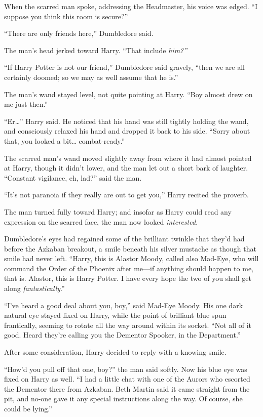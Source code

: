 When the scarred man spoke, addressing the Headmaster, his voice was
edged. ``I suppose you think this room is secure?''

``There are only friends here,'' Dumbledore said.

The man's head jerked toward Harry. ``That include \emph{him?''}

``If Harry Potter is not our friend,'' Dumbledore said gravely, ``then
we are all certainly doomed; so we may as well assume that he is.''

The man's wand stayed level, not quite pointing at Harry. ``Boy almost
drew on me just then.''

``Er\ldots{}'' Harry said. He noticed that his hand was still tightly
holding the wand, and consciously relaxed his hand and dropped it back
to his side. ``Sorry about that, you looked a bit\ldots{}
combat-ready.''

The scarred man's wand moved slightly away from where it had almost
pointed at Harry, though it didn't lower, and the man let out a short
bark of laughter. ``Constant vigilance, eh, lad?'' said the man.

``It's not paranoia if they really are out to get you,'' Harry recited
the proverb.

The man turned fully toward Harry; and insofar as Harry could read any
expression on the scarred face, the man now looked \emph{interested}.

Dumbledore's eyes had regained some of the brilliant twinkle that they'd
had before the Azkaban breakout, a smile beneath his silver mustache as
though that smile had never left. ``Harry, this is Alastor Moody, called
also Mad-Eye, who will command the Order of the Phoenix after me---if
anything should happen to me, that is. Alastor, this is Harry Potter. I
have every hope the two of you shall get along \emph{fantastically}.''

``I've heard a good deal about you, boy,'' said Mad-Eye Moody. His one
dark natural eye stayed fixed on Harry, while the point of brilliant
blue spun frantically, seeming to rotate all the way around within its
socket. ``Not all of it good. Heard they're calling you the Dementor
Spooker, in the Department.''

After some consideration, Harry decided to reply with a knowing smile.

``How'd you pull off that one, boy?'' the man said softly. Now his blue
eye was fixed on Harry as well. ``I had a little chat with one of the
Aurors who escorted the Dementor there from Azkaban. Beth Martin said it
came straight from the pit, and no-one gave it any special instructions
along the way. Of course, she could be lying.''

